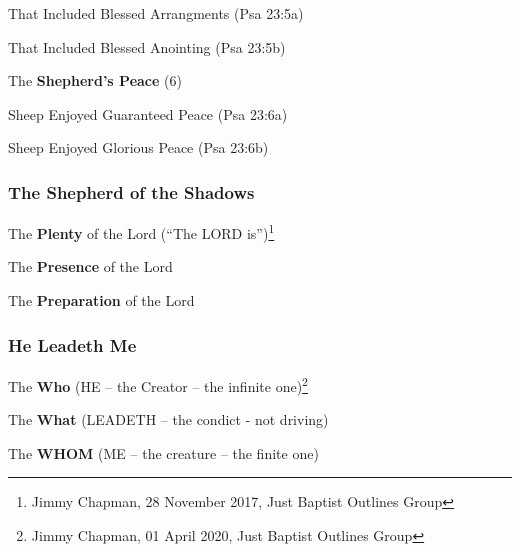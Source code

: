 \begin{compactenum}[I.]
    \begin{compactenum}[A.]
        \item That Included Blessed Arrangments (Psa 23:5a)
        \item That Included Blessed Anointing (Psa 23:5b)
    \end{compactenum}
    \item The \textbf{Shepherd's Peace} (6)
    \begin{compactenum}[A.]
        \item Sheep Enjoyed Guaranteed Peace (Psa 23:6a) \item Sheep Enjoyed Glorious Peace (Psa 23:6b)
    \end{compactenum}
\end{compactenum}

\subsubsection{The Shepherd of the Shadows}
\begin{compactenum}[I.]
    \item The \textbf{Plenty} of the Lord (``The LORD is'')\footnote{Jimmy Chapman, 28 November 2017, Just Baptist Outlines Group}
    \item The \textbf{Presence} of the Lord 
    \item The \textbf{Preparation} of the Lord 
\end{compactenum}

\subsubsection{He Leadeth Me}
\begin{compactenum}[I.]
    \item The \textbf{Who} (HE -- the Creator -- the infinite one)\footnote{Jimmy Chapman, 01 April 2020, Just Baptist Outlines Group}
    \item The \textbf{What} (LEADETH -- the condict - not driving)
    \item The \textbf{WHOM} (ME -- the creature -- the finite one)
\end{compactenum}


